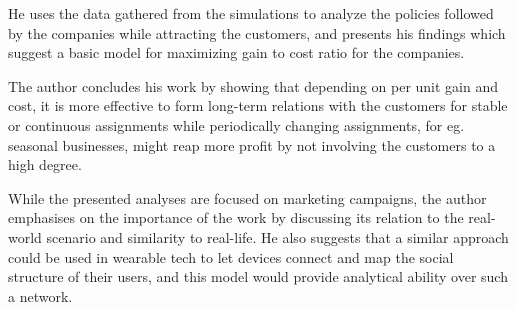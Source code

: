 He uses the data gathered from the simulations to analyze the policies followed by the companies while attracting the customers, and presents his findings which suggest a basic model for maximizing gain to cost ratio for the companies.

The author concludes his work by showing that depending on per unit gain and cost, it is more effective to form long-term relations with the customers for stable or continuous assignments while periodically changing assignments, for eg. seasonal businesses, might reap more profit by not involving the customers to a high degree. 

While the presented analyses are focused on marketing campaigns, the author emphasises on the importance of the work by discussing its relation to the real-world scenario and similarity to real-life. He also suggests that a similar approach could be used in wearable tech to let devices connect and map the social structure of their users, and this model would provide analytical ability over such a network.
